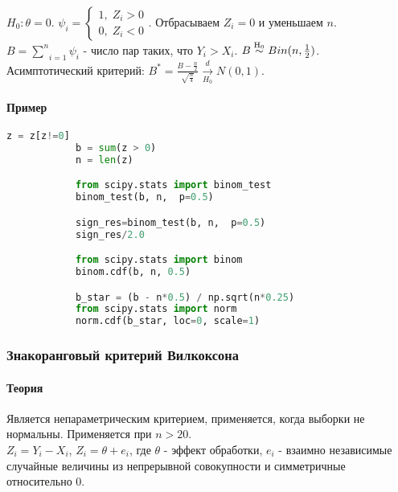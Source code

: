 		$H_0: \theta = 0$. $\psi_i = \begin{cases}
			1, \; Z_i > 0 \\
			0, \; Z_i < 0
		\end{cases}$. Отбрасываем $Z_i = 0$ и уменьшаем $n$. $B = \underset{i=1}{\overset{n}{\sum}}\psi_i$ - число пар таких, что $Y_i > X_i$. $B \mathrel{\stackrel{\rm H_0}\sim} Bin (n, \frac{1}{2})$.\\

		Асимптотический критерий: $B^{*} = \frac{B - \frac{n}{2}}{\sqrt{\frac{n}{4}}} \xrightarrow[H_0]{d}N(0,1)$.

		\paragraph*{Пример}\label{cha:2sample/sec:mo/subsec:pair/subsubsec:signes/par:prob}

		\begin{lstlisting}[language=Python]
			z = z[z!=0] 
			b = sum(z > 0)
			n = len(z)

			from scipy.stats import binom_test
			binom_test(b, n,  p=0.5)

			sign_res=binom_test(b, n,  p=0.5)
			sign_res/2.0

			from scipy.stats import binom
			binom.cdf(b, n, 0.5)

			b_star = (b - n*0.5) / np.sqrt(n*0.25)
			from scipy.stats import norm
			norm.cdf(b_star, loc=0, scale=1)
		\end{lstlisting}

	\subsubsection{Знакоранговый критерий Вилкоксона}\label{cha:2sample/sec:mo/subsec:pair/subsubsec:wilcox}

		\paragraph*{Теория}\label{cha:2sample/sec:mo/subsec:pair/subsubsec:wilcox/par:theory}

		Является непараметрическим критерием, применяется, когда выборки не нормальны. Применяется при $n > 20$.\\

		$Z_i = Y_i - X_i$, $Z_i = \theta + e_i$, где $\theta$ - эффект обработки, $e_i$ - взаимно независимые случайные величины из непрерывной совокупности и симметричные относительно 0.\\

